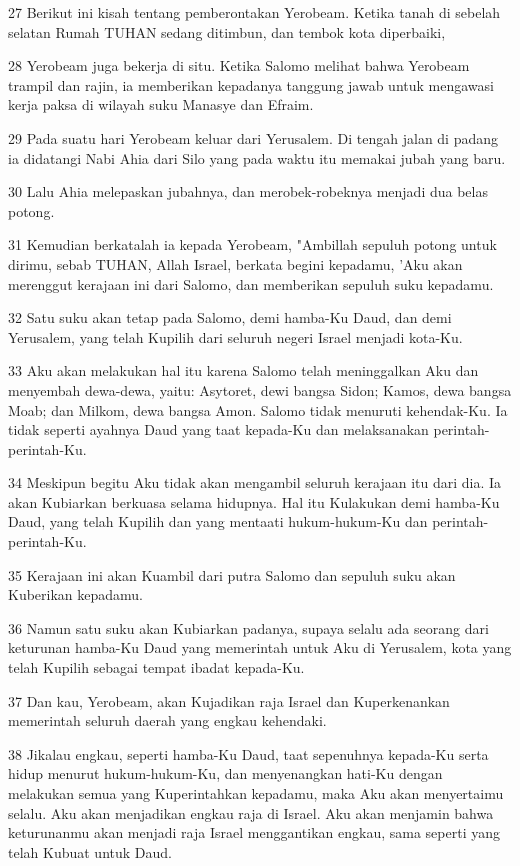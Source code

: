 \par 27 Berikut ini kisah tentang pemberontakan Yerobeam. Ketika tanah di sebelah selatan Rumah TUHAN sedang ditimbun, dan tembok kota diperbaiki,
\par 28 Yerobeam juga bekerja di situ. Ketika Salomo melihat bahwa Yerobeam trampil dan rajin, ia memberikan kepadanya tanggung jawab untuk mengawasi kerja paksa di wilayah suku Manasye dan Efraim.
\par 29 Pada suatu hari Yerobeam keluar dari Yerusalem. Di tengah jalan di padang ia didatangi Nabi Ahia dari Silo yang pada waktu itu memakai jubah yang baru.
\par 30 Lalu Ahia melepaskan jubahnya, dan merobek-robeknya menjadi dua belas potong.
\par 31 Kemudian berkatalah ia kepada Yerobeam, "Ambillah sepuluh potong untuk dirimu, sebab TUHAN, Allah Israel, berkata begini kepadamu, 'Aku akan merenggut kerajaan ini dari Salomo, dan memberikan sepuluh suku kepadamu.
\par 32 Satu suku akan tetap pada Salomo, demi hamba-Ku Daud, dan demi Yerusalem, yang telah Kupilih dari seluruh negeri Israel menjadi kota-Ku.
\par 33 Aku akan melakukan hal itu karena Salomo telah meninggalkan Aku dan menyembah dewa-dewa, yaitu: Asytoret, dewi bangsa Sidon; Kamos, dewa bangsa Moab; dan Milkom, dewa bangsa Amon. Salomo tidak menuruti kehendak-Ku. Ia tidak seperti ayahnya Daud yang taat kepada-Ku dan melaksanakan perintah-perintah-Ku.
\par 34 Meskipun begitu Aku tidak akan mengambil seluruh kerajaan itu dari dia. Ia akan Kubiarkan berkuasa selama hidupnya. Hal itu Kulakukan demi hamba-Ku Daud, yang telah Kupilih dan yang mentaati hukum-hukum-Ku dan perintah-perintah-Ku.
\par 35 Kerajaan ini akan Kuambil dari putra Salomo dan sepuluh suku akan Kuberikan kepadamu.
\par 36 Namun satu suku akan Kubiarkan padanya, supaya selalu ada seorang dari keturunan hamba-Ku Daud yang memerintah untuk Aku di Yerusalem, kota yang telah Kupilih sebagai tempat ibadat kepada-Ku.
\par 37 Dan kau, Yerobeam, akan Kujadikan raja Israel dan Kuperkenankan memerintah seluruh daerah yang engkau kehendaki.
\par 38 Jikalau engkau, seperti hamba-Ku Daud, taat sepenuhnya kepada-Ku serta hidup menurut hukum-hukum-Ku, dan menyenangkan hati-Ku dengan melakukan semua yang Kuperintahkan kepadamu, maka Aku akan menyertaimu selalu. Aku akan menjadikan engkau raja di Israel. Aku akan menjamin bahwa keturunanmu akan menjadi raja Israel menggantikan engkau, sama seperti yang telah Kubuat untuk Daud.
